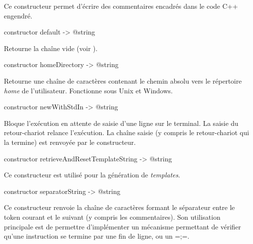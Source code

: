 Ce constructeur permet d'écrire des commentaires encadrés dans le code C++ engendré.



\begin{galgas3box}
constructor default -> @string
\end{galgas3box}

Retourne la chaîne vide (voir ).





\begin{galgas3box}
constructor homeDirectory -> @string
\end{galgas3box}

Retourne une chaîne de caractères contenant le chemin absolu vers le répertoire \emph{home} de l'utilisateur. Fonctionne sous Unix et Windows.





\begin{galgas3box}
constructor newWithStdIn -> @string
\end{galgas3box}

Bloque l'exécution en attente de saisie d'une ligne sur le terminal. La saisie du retour-chariot relance l'exécution. La chaîne saisie (y compris le retour-chariot qui la termine) est renvoyée par le constructeur.







\begin{galgas3box}
constructor retrieveAndResetTemplateString -> @string
\end{galgas3box}

Ce constructeur est utilisé pour la génération de \emph{templates}.







\begin{galgas3box}
constructor separatorString -> @string
\end{galgas3box}

Ce constructeur renvoie la chaîne de caractères formant le séparateur entre le token courant et le suivant (y compris les commentaires). Son utilisation principale est de permettre d'implémenter un mécanisme permettant de vérifier qu'une instruction se termine par une fin de ligne, ou un \ggst=;=.

